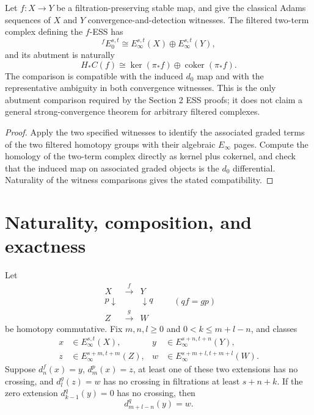 \begin{theorem}
  \label{thm:fess-e0-abutment-comparison}
  \notready
  Let $f:X\to Y$ be a filtration-preserving stable map, and give the classical
  Adams sequences of $X$ and $Y$ convergence-and-detection witnesses.  The
  filtered two-term complex defining the $f$-ESS has
  \[
    {}^fE_0^{s,t}\cong E_\infty^{s,t}(X)\oplus E_\infty^{s,t}(Y),
  \]
  and its abutment is naturally
  \[
    H_*C(f)\cong\ker(\pi_*f)\oplus\operatorname{coker}(\pi_*f).
  \]
  The comparison is compatible with the induced $d_0$ map and with the
  representative ambiguity in both convergence witnesses.  This is the only
  abutment comparison required by the Section 2 ESS proofs; it does not claim
  a general strong-convergence theorem for arbitrary filtered complexes.
\end{theorem}

\begin{proof}
  Apply the two specified witnesses to identify the associated graded terms of
  the two filtered homotopy groups with their algebraic $E_\infty$ pages.
  Compute the homology of the two-term complex directly as kernel plus
  cokernel, and check that the induced map on associated graded objects is the
  $d_0$ differential.  Naturality of the witness comparisons gives the stated
  compatibility.
\end{proof}

\section{Naturality, composition, and exactness}

\begin{theorem}
  \label{thm:fess-commutative-square}
  \notready
  Let
  \[
  \begin{array}{ccc}
    X&\xrightarrow{f}&Y\\
    \mathord{p}\downarrow&&\downarrow\mathord{q}\\
    Z&\xrightarrow{g}&W
  \end{array}
  \qquad(qf=gp)
  \]
  be homotopy commutative.  Fix $m,n,l\ge0$ and
  $0<k\le m+l-n$, and classes
  \[
  \begin{aligned}
    x&\in E_\infty^{s,t}(X),&
    y&\in E_\infty^{s+n,t+n}(Y),\\
    z&\in E_\infty^{s+m,t+m}(Z),&
    w&\in E_\infty^{s+m+l,t+m+l}(W).
  \end{aligned}
  \]
  Suppose $d_n^f(x)=y$, $d_m^p(x)=z$, at least one of these two extensions
  has no crossing, and $d_l^g(z)=w$ has no crossing in filtrations at least
  $s+n+k$.  If the zero extension $d_{k-1}^q(y)=0$ has no crossing, then
  \[
    d_{m+l-n}^q(y)=w.
  \]
\end{theorem}


